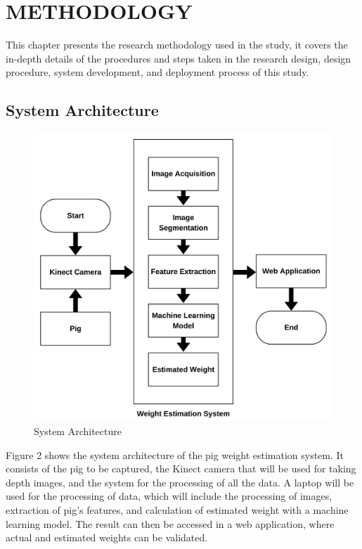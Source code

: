 \chapter{METHODOLOGY}
{\baselineskip
	
This chapter presents the research methodology used in the study, it covers the in-depth details of the procedures and steps taken in the research design, design procedure, system development, and deployment process of this study.


\section { System Architecture}

\begin{figure}[h]
	\centering
	\includegraphics[height=0.5\textheight]{figures/Architectureofniggas}
	\caption{System Architecture}
	\label{fig:System Architecture}
\end{figure}

Figure 2 shows the system architecture of the pig weight estimation system. It consists of the pig to be captured, the Kinect camera that will be used for taking depth images, and the system for the processing of all the data. A laptop will be used for the processing of data, which will include the processing of images, extraction of pig’s features, and calculation of estimated weight with a machine learning model. The result can then be accessed in a web application, where actual and estimated weights can be validated.

}
